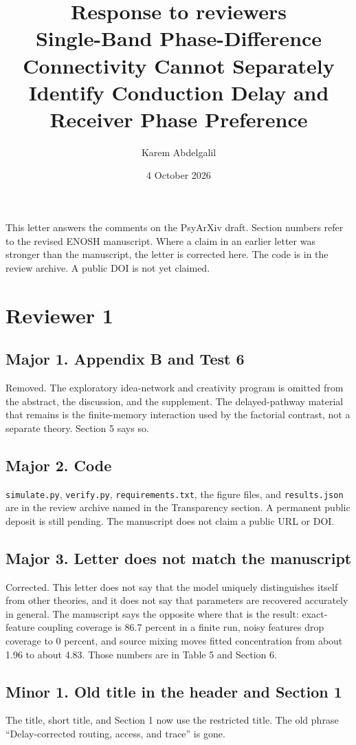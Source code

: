\documentclass[11pt]{article}
\title{Response to reviewers\\[0.3em]\large Single-Band Phase-Difference Connectivity Cannot Separately Identify Conduction Delay and Receiver Phase Preference}
\author{Karem Abdelgalil}
\date{4 October 2026}
\begin{document}
\maketitle

This letter answers the comments on the PsyArXiv draft. Section numbers refer to the revised ENOSH manuscript. Where a claim in an earlier letter was stronger than the manuscript, the letter is corrected here. The code is in the review archive. A public DOI is not yet claimed.

\section*{Reviewer 1}

\subsection*{Major 1. Appendix B and Test 6}
Removed. The exploratory idea-network and creativity program is omitted from the abstract, the discussion, and the supplement. The delayed-pathway material that remains is the finite-memory interaction used by the factorial contrast, not a separate theory. Section 5 says so.

\subsection*{Major 2. Code}
\texttt{simulate.py}, \texttt{verify.py}, \texttt{requirements.txt}, the figure files, and \texttt{results.json} are in the review archive named in the Transparency section. A permanent public deposit is still pending. The manuscript does not claim a public URL or DOI.

\subsection*{Major 3. Letter does not match the manuscript}
Corrected. This letter does not say that the model uniquely distinguishes itself from other theories, and it does not say that parameters are recovered accurately in general. The manuscript says the opposite where that is the result: exact-feature coupling coverage is 86.7 percent in a finite run, noisy features drop coverage to 0 percent, and source mixing moves fitted concentration from about 1.96 to about 4.83. Those numbers are in Table 5 and Section 6.

\subsection*{Minor 1. Old title in the header and Section 1}
The title, short title, and Section 1 now use the restricted title. The old phrase ``Delay-corrected routing, access, and trace'' is gone.
\end{document}
